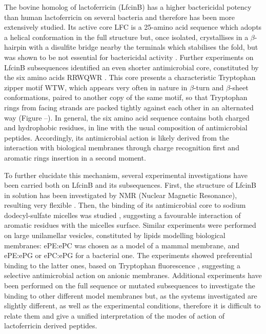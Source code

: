 The bovine homolog of lactoferricin (LfcinB) has a higher bactericidal potency than human lactoferricin on several bacteria \cite{Cochran2001} and therefore has been more extensively studied. Its active core LFC is a 25-amino acid sequence which adopts a helical conformation in the full structure but, once isolated, crystallises in a $\beta$-hairpin with a disulfite bridge nearby the terminals which stabilises the fold, but was shown to be not essential for bactericidal activity \cite{Cochran2001}.
%
Further experiments on LfcinB subsequences identified an even shorter antimicrobial core, constituted by the six amino acids RRWQWR \cite{Schibli1999}. This core presents a characteristic Tryptophan zipper motif WTW, which appears very often in nature in $\beta$-turn and $\beta$-sheet conformations, paired to another copy of the same motif, so that Tryptophan rings from facing strands are packed tightly against each other in an alternated way \cite{Cochran2001} (Figure --).
In general, the six amino acid sequence contains both charged and hydrophobic residues, in line with the usual composition of antimicrobial peptides. Accordingly, its antimicrobial action is likely derived from the interaction with biological membranes through charge recognition first and aromatic rings insertion in a second moment.

To further elucidate this mechanism, several experimental investigations have been carried both on LfcinB and its subsequences. First, the structure of LfcinB in solution has been investigated by NMR (Nuclear Magnetic Resonance), resulting very flexible \cite{Hwang1998}. Then, the binding of its antimicrobial core to sodium dodecyl-sulfate micelles was studied \cite{Schibli1999}, suggesting a favourable interaction of aromatic residues with the micelles surface.
%
Similar experiments were performed on large unilamellar vesicles, constituted by lipids modelling biological membranes: ePE:ePC was chosen as a model of a mammal membrane, and ePE:ePG or ePC:ePG for a bacterial one. The experiments showed preferential binding to the latter ones, based on Tryptophan fluorescence \cite{Nguyen2005}, suggesting a selective antimicrobial action on anionic membranes.
%
Additional experiments have been performed on the full sequence or mutated subsequences \cite{Tsutsumi2012,Arseneault2010} to investigate the binding to other different model membranes but, as the systems investigated are slightly different, as well as the experimental conditions, therefore it is difficult to relate them and give a unified interpretation of the modes of action of lactoferricin derived peptides.

